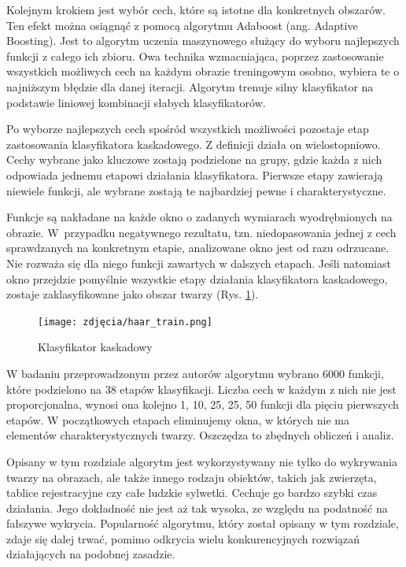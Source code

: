 Kolejnym krokiem jest wybór cech, które są istotne dla konkretnych obszarów. Ten efekt można osiągnąć z pomocą algorytmu Adaboost (ang. Adaptive Boosting). Jest to  algorytm uczenia maszynowego służący do wyboru najlepszych funkcji z całego ich zbioru. Owa technika wzmacniająca, poprzez zastosowanie wszystkich możliwych cech na każdym obrazie treningowym osobno, wybiera te o najniższym błędzie dla danej iteracji. Algorytm trenuje silny klasyfikator na podstawie liniowej kombinacji słabych klasyfikatorów.
 
Po wyborze najlepszych cech spośród wszystkich możliwości pozostaje etap zastosowania klasyfikatora kaskadowego. Z definicji działa on wielostopniowo. Cechy wybrane jako kluczowe zostają podzielone na grupy, gdzie każda z nich odpowiada jednemu etapowi działania klasyfikatora. Pierwsze etapy zawierają niewiele funkcji, ale wybrane zostają te najbardziej pewne i charakterystyczne. 
 
Funkcje są nakładane na każde okno o zadanych wymiarach wyodrębnionych na obrazie. W~przypadku negatywnego rezultatu, tzn. niedopasowania jednej z cech sprawdzanych na konkretnym etapie, analizowane okno jest od razu odrzucane. Nie rozważa się dla niego funkcji zawartych w dalszych etapach. Jeśli natomiast okno przejdzie pomyślnie wszystkie etapy działania klasyfikatora kaskadowego, zostaje zaklasyfikowane jako obszar twarzy (Rys. \ref{fig:cascadeClasificator}).  

\begin{figure}[h]
	\centering
	\texttt{[image: zdjęcia/haar\_train.png]}
	\caption{Klasyfikator kaskadowy \cite{haarCascade}} 
	\label{fig:cascadeClasificator}
\end{figure}
 
W badaniu przeprowadzonym przez autorów algorytmu wybrano 6000 funkcji, które podzielono na 38 etapów klasyfikacji. Liczba cech w każdym z nich nie jest proporcjonalna, wynosi ona kolejno 1, 10, 25, 25, 50 funkcji dla pięciu pierwszych etapów. W początkowych etapach eliminujemy okna, w których nie ma elementów charakterystycznych twarzy. Oszczędza to zbędnych obliczeń i analiz.

Opisany w tym rozdziale algorytm jest wykorzystywany nie tylko do wykrywania twarzy na obrazach, ale także innego rodzaju obiektów, takich jak zwierzęta, tablice rejestracyjne czy całe ludzkie sylwetki. Cechuje go bardzo szybki czas działania. Jego dokładność nie jest aż tak wysoka, ze względu na podatność na fałszywe wykrycia.  Popularność algorytmu, który został opisany w tym rozdziale, zdaje się dalej trwać, pomimo odkrycia wielu konkurencyjnych rozwiązań działających na podobnej zasadzie. 

